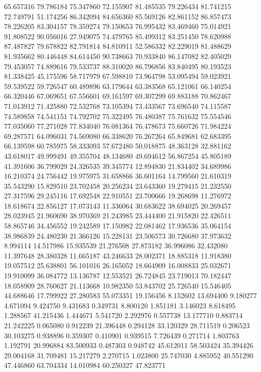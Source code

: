 65.657316
79.786184
75.347860
72.155907
81.485535
79.226434
81.741215
72.749791
51.174256
86.342094
84.656360
85.569126
82.861152
86.857473
78.226205
83.304157
78.359274
79.150653
76.995432
83.469460
75.014921
91.808522
90.056016
27.949075
74.479765
85.499312
83.251450
78.620988
87.487827
79.678822
82.791814
84.810911
52.586332
82.229019
81.488629
81.935662
80.446448
84.614450
90.738663
70.933840
86.147082
82.405029
79.453057
74.889616
79.533737
88.310020
86.796856
83.840495
80.193523
81.338425
45.175596
58.717979
67.598810
73.964798
53.095494
59.023921
59.539522
59.726547
60.489896
63.179644
63.383568
65.121061
66.140254
66.320446
67.069651
67.556601
69.161597
69.307299
69.883188
70.862467
71.013912
71.425880
72.532768
73.105394
73.433567
73.696540
74.115587
74.589858
74.541151
74.792702
75.322495
76.480387
75.761632
75.554546
77.035060
77.271028
77.834040
76.081364
76.478673
75.660726
71.984224
69.287571
64.096031
74.569080
66.338620
76.267264
65.849681
62.683395
66.139598
60.785975
58.333093
57.672480
50.018875
48.363128
32.881162
43.618017
49.999491
49.355704
48.134680
49.694612
56.867254
45.805189
41.391606
36.799029
24.326535
39.345774
12.894830
21.834402
34.689986
16.210374
24.756442
19.975975
31.658866
36.601164
14.799560
21.610319
35.543290
15.829510
23.702458
20.256234
23.643360
19.279415
21.232550
27.317596
29.245116
17.692548
22.910551
23.700666
19.268698
11.276972
18.618674
22.856127
17.073143
11.336064
30.683622
38.694025
20.269457
28.023945
21.960690
38.970369
21.243985
23.444400
21.915820
22.426511
58.865746
34.456552
19.242589
17.150982
22.081462
17.936536
35.064154
38.986839
24.480230
21.366126
15.228131
23.506573
30.726680
37.973632
8.994114
14.517986
15.935539
21.276508
27.873182
36.996086
32.432080
11.397648
28.380328
11.665187
43.246633
28.002371
18.885318
11.918380
19.057512
25.638801
56.101016
26.165052
18.664909
16.008833
25.032671
19.910099
36.084772
13.136787
12.553521
26.724845
23.719013
70.182447
18.058909
28.760627
21.113668
10.982350
53.843702
25.726540
15.546405
44.688646
17.799922
27.280583
55.073351
19.156456
8.152602
13.694400
9.180277
4.671094
9.424750
9.431683
0.349731
8.800120
1.851181
3.146023
8.618495
1.288567
41.215436
1.444671
5.541720
2.292976
0.557738
13.177710
0.883714
21.242225
0.065080
0.912239
21.396448
0.294128
33.120329
28.711519
0.206523
30.103275
0.938896
0.359307
0.410901
0.939515
7.726439
0.271714
1.803763
1.192791
20.996884
83.500933
0.487303
0.948742
45.612011
58.503424
35.394426
29.004168
31.709481
15.217279
2.270715
1.023800
25.747030
4.885952
40.551290
47.446860
63.704334
14.010984
60.250327
47.823771
